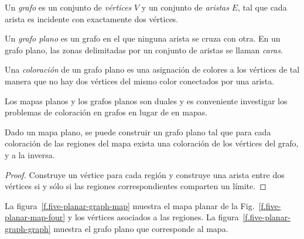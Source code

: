 {{\begin{definition}
Un \emph{grafo} es un conjunto de \emph{vértices} $V$ y un conjunto de \emph{aristas} $E$, tal que cada arista es incidente con exactamente dos vértices.

Un \emph{grafo plano} es un grafo en el que ninguna arista se cruza con otra. En un grafo plano, las zonas delimitadas por un conjunto de aristas se llaman \emph{caras}.

Una \emph{coloración} de un grafo plano es una asignación de colores a los vértices de tal manera que no hay dos vértices del mismo color conectados por una arista.
\end{definition}

Los mapas planos y los grafos planos son duales y es conveniente investigar los problemas de coloración en grafos en lugar de en mapas.

\begin{theorem}
Dado un mapa plano, se puede construir un grafo plano tal que para cada coloración de las regiones del mapa exista una coloración de los vértices del grafo, y a la inversa.
\end{theorem}

\begin{proof}
Construye un vértice para cada región y construye una arista entre dos vértices si y sólo si las regiones correspondientes comparten un límite. 
\end{proof}

\begin{example}
La figura~\ref{f.five-planar-graph-map} muestra el mapa planar de la Fig.~\ref{f.five-planar-map-four} y los vértices asociados a las regiones. La figura~\ref{f.five-planar-graph-graph} muestra el grafo plano que corresponde al mapa.
\end{example}

\begin{figure}[t]
\begin{minipage}{.45\textwidth}
\begin{center}
\end{center}
\end{minipage}
\end{figure}}}
